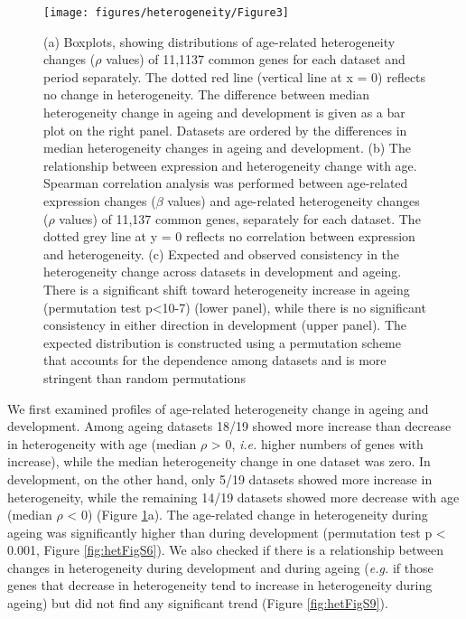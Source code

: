 \documentclass[12pt,twoside]{unicam}
\begin{document}
\begin{figure}

{\centering \texttt{[image: figures/heterogeneity/Figure3]} 

}

\caption[a) Distributions of age-related changes in gene expression heterogeneity across datasets, b) The relationship between the age-related change in gene expression level and heterogeneity, c) Consistency in the change in gene expression heterogeneity.]{(a) Boxplots, showing distributions of age-related heterogeneity changes ($\rho$ values) of 11,1137 common genes for each dataset and period separately. The dotted red line (vertical line at x = 0) reflects no change in heterogeneity. The difference between median heterogeneity change in ageing and development is given as a bar plot on the right panel. Datasets are ordered by the differences in median heterogeneity changes in ageing and development. (b) The relationship between expression and heterogeneity change with age. Spearman correlation analysis was performed between age-related expression changes ($\beta$ values) and age-related heterogeneity changes ($\rho$ values) of 11,137 common genes, separately for each dataset. The dotted grey line at y = 0 reflects no correlation between expression and heterogeneity. (c) Expected and observed consistency in the heterogeneity change across datasets in development and ageing. There is a significant shift toward heterogeneity increase in ageing (permutation test p<10-7) (lower panel), while there is no significant consistency in either direction in development (upper panel). The expected distribution is constructed using a permutation scheme that accounts for the dependence among datasets and is more stringent than random permutations}\label{fig:hetFig3}
\end{figure}

We first examined profiles of age-related heterogeneity change in ageing and development. Among ageing datasets 18/19 showed more increase than decrease in heterogeneity with age (median \(\rho\) \textgreater{} 0, \emph{i.e.} higher numbers of genes with increase), while the median heterogeneity change in one dataset was zero. In development, on the other hand, only 5/19 datasets showed more increase in heterogeneity, while the remaining 14/19 datasets showed more decrease with age (median \(\rho\) \textless{} 0) (Figure \ref{fig:hetFig3}a). The age-related change in heterogeneity during ageing was significantly higher than during development (permutation test p \textless{} 0.001, Figure \ref{fig:hetFigS6}). We also checked if there is a relationship between changes in heterogeneity during development and during ageing (\emph{e.g.} if those genes that decrease in heterogeneity tend to increase in heterogeneity during ageing) but did not find any significant trend (Figure \ref{fig:hetFigS9}).
\end{document}
